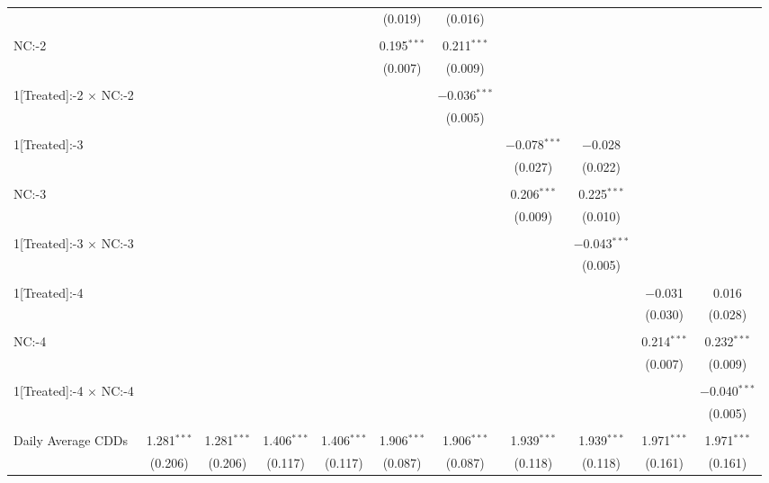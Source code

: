 \begin{table}[!htbp]
\begin{tabular}{@{\extracolsep{5pt}}lcccccccccc}
  &  &  &  &  & (0.019) & (0.016) &  &  &  &  \\ 
  & & & & & & & & & & \\ 
 NC:-2 &  &  &  &  & 0.195$^{***}$ & 0.211$^{***}$ &  &  &  &  \\ 
  &  &  &  &  & (0.007) & (0.009) &  &  &  &  \\ 
  & & & & & & & & & & \\ 
 1[Treated]:-2 $\times$ NC:-2 &  &  &  &  &  & $-$0.036$^{***}$ &  &  &  &  \\ 
  &  &  &  &  &  & (0.005) &  &  &  &  \\ 
  & & & & & & & & & & \\ 
 1[Treated]:-3 &  &  &  &  &  &  & $-$0.078$^{***}$ & $-$0.028 &  &  \\ 
  &  &  &  &  &  &  & (0.027) & (0.022) &  &  \\ 
  & & & & & & & & & & \\ 
 NC:-3 &  &  &  &  &  &  & 0.206$^{***}$ & 0.225$^{***}$ &  &  \\ 
  &  &  &  &  &  &  & (0.009) & (0.010) &  &  \\ 
  & & & & & & & & & & \\ 
 1[Treated]:-3 $\times$ NC:-3 &  &  &  &  &  &  &  & $-$0.043$^{***}$ &  &  \\ 
  &  &  &  &  &  &  &  & (0.005) &  &  \\ 
  & & & & & & & & & & \\ 
 1[Treated]:-4 &  &  &  &  &  &  &  &  & $-$0.031 & 0.016 \\ 
  &  &  &  &  &  &  &  &  & (0.030) & (0.028) \\ 
  & & & & & & & & & & \\ 
 NC:-4 &  &  &  &  &  &  &  &  & 0.214$^{***}$ & 0.232$^{***}$ \\ 
  &  &  &  &  &  &  &  &  & (0.007) & (0.009) \\ 
  & & & & & & & & & & \\ 
 1[Treated]:-4 $\times$ NC:-4 &  &  &  &  &  &  &  &  &  & $-$0.040$^{***}$ \\ 
  &  &  &  &  &  &  &  &  &  & (0.005) \\ 
  & & & & & & & & & & \\ 
 Daily Average CDDs & 1.281$^{***}$ & 1.281$^{***}$ & 1.406$^{***}$ & 1.406$^{***}$ & 1.906$^{***}$ & 1.906$^{***}$ & 1.939$^{***}$ & 1.939$^{***}$ & 1.971$^{***}$ & 1.971$^{***}$ \\ 
  & (0.206) & (0.206) & (0.117) & (0.117) & (0.087) & (0.087) & (0.118) & (0.118) & (0.161) & (0.161) \\ 

\end{tabular}
\end{table}
